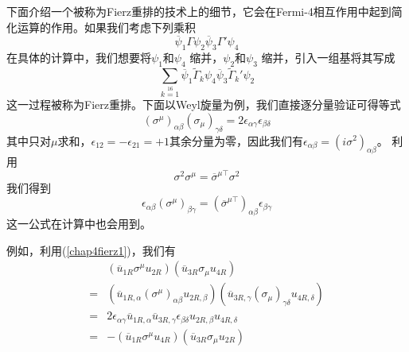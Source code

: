 下面介绍一个被称为Fierz重排的技术上的细节，它会在Fermi-4相互作用中起到简化运算的作用。如果我们考虑下列乘积
\begin{equation}
    \overline{\psi}_{1}\Gamma\psi_{2}\overline{\psi}_{3}\Gamma'\psi_{4}
\end{equation}
在具体的计算中，我们想要将$\psi_{1}$和$\psi_{4}$ 缩并，$\psi_{2}$和$\psi_{3}$ 缩并，引入一组基将其写成
\begin{equation}
    \sum\limits_{k=1}\limits^{16}\overline{\psi}_{1}\tilde{\Gamma}_{k}\psi_{4}\overline{\psi}_{3}\tilde{\Gamma}_{k}'\psi_{2}
\end{equation}
这一过程被称为Fierz重排。下面以Weyl旋量为例，我们直接逐分量验证可得等式
\begin{equation}
\label{chap4fierz1}
    (\sigma^{\mu})_{\alpha\beta}(\sigma_{\mu})_{\gamma\delta}=2\epsilon_{\alpha\gamma}\epsilon_{\beta\delta}
\end{equation}
其中只对$\mu$求和，$\epsilon_{12}=-\epsilon_{21}=+1$其余分量为零，因此我们有$\epsilon_{\alpha\beta}=(i\sigma^{2})_{\alpha\beta}$。
利用
\begin{equation}
\sigma^{2}\sigma^{\mu}=\overline{\sigma}^{\mu\top}\sigma^{2}
\end{equation}
我们得到
\begin{equation}
    \epsilon_{\alpha\beta}(\sigma^{\mu})_{\beta\gamma}=(\overline{\sigma}^{\mu\top})_{\alpha\beta}\epsilon_{\beta\gamma}
\end{equation}
这一公式在计算中也会用到。

例如，利用(\ref{chap4fierz1})，我们有
\begin{equation}
\begin{aligned}
 &\left(\overline{u}_{1R}\sigma^{\mu}u_{2R}\right) \left(\overline{u}_{3R}\sigma_{\mu}u_{4R}\right)\\
 =&\left(\overline{u}_{1R,\alpha}(\sigma^{\mu})_{\alpha\beta}u_{2R,\beta}\right) \left(\overline{u}_{3R,\gamma}(\sigma_{\mu})_{\gamma\delta}u_{4R,\delta}\right)\\
 =&2\epsilon_{\alpha\gamma}\overline{u}_{1R,\alpha}\overline{u}_{3R,\gamma}\epsilon_{\beta\delta}u_{2R,\beta}u_{4R,\delta}\\
 =&-\left(\overline{u}_{1R}\sigma^{\mu}u_{4R}\right) \left(\overline{u}_{3R}\sigma_{\mu}u_{2R}\right)
 \end{aligned}
\end{equation}
